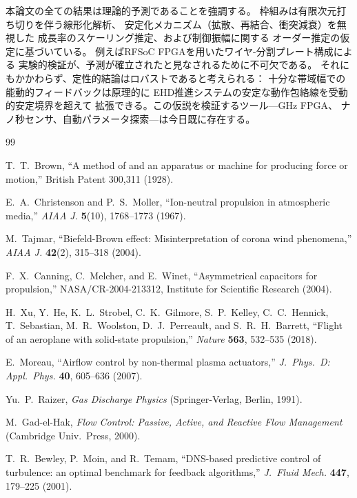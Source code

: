 \documentclass[12pt,twocolumn]{ltjsarticle}
\begin{document}
本論文の全ての結果は理論的予測であることを強調する。
枠組みは有限次元打ち切りを伴う線形化解析、
安定化メカニズム（拡散、再結合、衝突減衰）を無視した
成長率のスケーリング推定、および制御振幅に関する
オーダー推定の仮定に基づいている。
例えばRFSoC FPGAを用いたワイヤ-分割プレート構成による
実験的検証が、予測が確立されたと見なされるために不可欠である。
それにもかかわらず、定性的結論はロバストであると考えられる：
十分な帯域幅での能動的フィードバックは原理的に
EHD推進システムの安定な動作包絡線を受動的安定境界を超えて
拡張できる。この仮説を検証するツール---GHz FPGA、
ナノ秒センサ、自動パラメータ探索---は今日既に存在する。

\begin{thebibliography}{99}

T.~T.~Brown, ``A method of and an apparatus or machine for producing
force or motion,'' British Patent 300,311 (1928).

E.~A.~Christenson and P.~S.~Moller, ``Ion-neutral propulsion in
atmospheric media,'' \textit{AIAA J.} \textbf{5}(10), 1768--1773
(1967).

M.~Tajmar, ``Biefeld-Brown effect: Misinterpretation of corona wind
phenomena,'' \textit{AIAA J.} \textbf{42}(2), 315--318 (2004).

F.~X.~Canning, C.~Melcher, and E.~Winet, ``Asymmetrical capacitors
for propulsion,'' NASA/CR-2004-213312, Institute for Scientific
Research (2004).

H.~Xu, Y.~He, K.~L.~Strobel, C.~K.~Gilmore, S.~P.~Kelley,
C.~C.~Hennick, T.~Sebastian, M.~R.~Woolston, D.~J.~Perreault, and
S.~R.~H.~Barrett, ``Flight of an aeroplane with solid-state
propulsion,'' \textit{Nature} \textbf{563}, 532--535 (2018).

E.~Moreau, ``Airflow control by non-thermal plasma actuators,''
\textit{J.\ Phys.\ D: Appl.\ Phys.} \textbf{40}, 605--636 (2007).

Yu.~P.~Raizer, \textit{Gas Discharge Physics} (Springer-Verlag,
Berlin, 1991).

M.~Gad-el-Hak, \textit{Flow Control: Passive, Active, and Reactive
Flow Management} (Cambridge Univ.\ Press, 2000).

T.~R.~Bewley, P.~Moin, and R.~Temam, ``DNS-based predictive control
of turbulence: an optimal benchmark for feedback algorithms,''
\textit{J.\ Fluid Mech.} \textbf{447}, 179--225 (2001).


\end{thebibliography}
\end{document}
